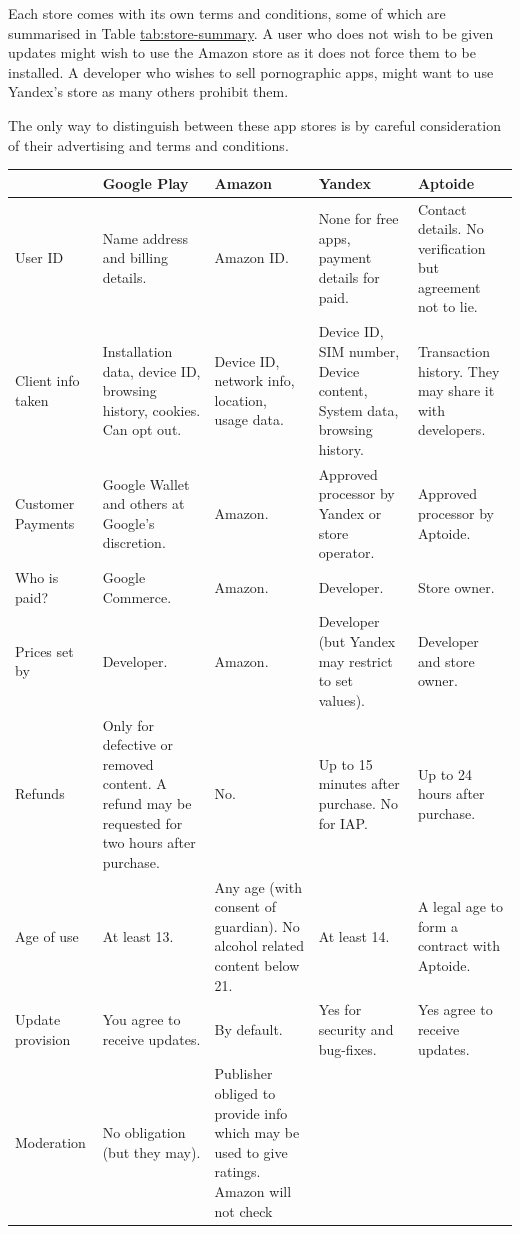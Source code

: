 \documentclass[thesis.tex]{subfiles}
\begin{document}
Each store comes with its own terms and conditions, some of which are
summarised in Table \url{tab:store-summary}. A user who does not wish to
be given updates might wish to use the Amazon store as it does not force
them to be installed. A developer who wishes to sell pornographic apps,
might want to use Yandex's store as many others prohibit them.

The only way to distinguish between these app stores is by
careful consideration of their advertising and terms and conditions.

\begin{table}\footnotesize
  \begin{tabulary}{\linewidth}{lLLLL}
    \toprule
    & Google Play & Amazon & Yandex & Aptoide\\
    \midrule
    User ID & Name address and billing details. & Amazon ID. & None for free
    apps, payment details for paid. & Contact details. No verification but
    agreement not to lie.\\
    Client info taken & Installation data, device ID, browsing history,
    cookies. Can opt out. & Device ID, network info, location, usage data. &
    Device ID, SIM number, Device content, System data, browsing history. &
    Transaction history. They may share it with developers.\\
    Customer Payments & Google Wallet and others at Google's discretion. &
    Amazon. & Approved processor by Yandex or store operator. & Approved
    processor by Aptoide.\\
    Who is paid? & Google Commerce. & Amazon. & Developer. & Store
    owner.\\
    Prices set by & Developer. & Amazon. & Developer (but Yandex may
    restrict to set values). & Developer and store owner.\\
    Refunds & Only for defective or removed content. A refund may be
    requested for two hours after purchase. & No. & Up to 15 minutes after
    purchase. No for IAP. & Up to 24 hours after purchase.\\
    Age of use & At least 13. & Any age (with consent of guardian). No
    alcohol related content below 21. & At least 14. & A legal age to form a
    contract with Aptoide.\\
    Update provision & You agree to receive updates. & By default. & Yes for
    security and bug-fixes. & Yes agree to receive updates.\\
    Moderation & No obligation (but they may). & Publisher obliged to
    provide info which may be used to give ratings. Amazon will not check

\end{tabulary}
\end{table}
\end{document}
